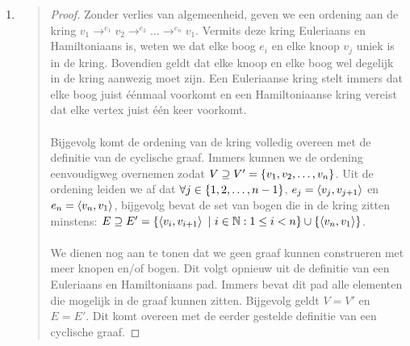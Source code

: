 \documentclass{article}
\begin{document}
\begin{question}[Grafentheorie]
\begin{answer}
\begin{enumerate}
\begin{quote}
\begin{proof}
  \paragraph{}
  Stel dat de wortel geen blad is, dan is de wortel een inwendige knoop met twee kinderen. Deze kinderen en hun nakomelingen vormen zelf ook een boom. Per \textbf{inductie} weten we dus dat de deelbomen van de kinderen zelf aan de voorwaarde voldoen. In dat geval is het aantal inwendige knopen van de boom dus gelijk aan: $i=1+i_l+i_r$ met $i_l$ het aantal inwendige knopen van het linker kind en $i_r$ het aantal inwendige knopen van het rechter kind. Het aantal bladen is gelijk aan $b=b_l+b_r$. Bovendien geldt: $b_l=i_l+1$ en $b_r=i_r+1$. Wanneer we substitutie uitvoeren op de originele formule om het aantal inwendige knopen te berekenen bekomen we dus: $b=b_l+b_r$ en $i=1+i_l+i_r=b_l-1+b_r-1+1=b_l+b_r-1=b-1$. Bijgevolg klopt de stelling.
 \end{proof}\end{quote}
 \item 
\begin{quote}\begin{proof}
Zonder verlies van algemeenheid, geven we een ordening aan de kring $v_1\rightarrow^{e_1}v_2\rightarrow^{e_2}\ldots\rightarrow^{e_n}v_1$. Vermits deze kring Euleriaans en Hamiltoniaans is, weten we dat elke boog $e_i$ en elke knoop $v_j$ uniek is in de kring. Bovendien geldt dat elke knoop en elke boog wel degelijk in de kring aanwezig moet zijn. Een Euleriaanse kring stelt immers dat elke boog juist \'e\'enmaal voorkomt en een Hamiltoniaanse kring vereist dat elke vertex juist \'e\'en keer voorkomt.
\paragraph{}
Bijgevolg komt de ordening van de kring volledig overeen met de definitie van de cyclische graaf. Immers kunnen we de ordening eenvoudigweg overnemen zodat $V\supseteq V'=\left\{ v_1,v_2,\ldots,v_n \right\}$. Uit de ordening leiden we af dat $\forall j\in\left\{ 1,2,\ldots,n-1 \right\}$, $e_j=\left\langle v_j,v_{j+1} \right\rangle$ en $e_n=\left\langle v_n,v_1 \right\rangle$, bijgevolg bevat de set van bogen die in de kring zitten minstens: $E\supseteq E'=\left\{ \left\langle v_i,v_{i+1} \right\rangle\ |\ i\in\mathbb{N}:1\leq i< n \right\}\cup\left\{ \left\langle v_n,v_1 \right\rangle \right\}$.
\paragraph{}
We dienen nog aan te tonen dat we geen graaf kunnen construeren met meer knopen en/of bogen. Dit volgt opnieuw uit de definitie van een Euleriaans en Hamiltoniaans pad. Immers bevat dit pad alle elementen die mogelijk in de graaf kunnen zitten. Bijgevolg geldt $V=V'$ en $E=E'$. Dit komt overeen met de eerder gestelde definitie van een cyclische graaf.
\end{proof}\end{quote}
\end{enumerate}
\end{answer}
\end{question}
\end{document}
